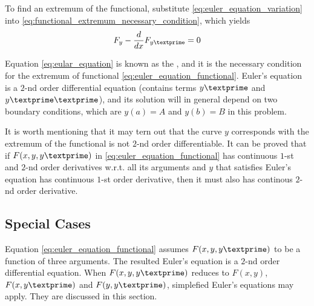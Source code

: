 To find an extremum of the functional, substitute \eqref{eq:euler_equation_variation} into \eqref{eq:functional_extremum_necessary_condition}, which yields
\begin{eqnarray}
F_y - \dfrac{d}{dx}F_{y\textprime} = 0 \label{eq:eular_equation}
\end{eqnarray}

Equation \eqref{eq:eular_equation} is known as the , and it is the necessary condition for the extremum of functional \eqref{eq:euler_equation_functional}. Euler's equation is a $2$-nd order differential equation (contains terms $y\textprime$ and $y\textprime\textprime$), and its solution will in general depend on two boundary conditions, which are $y(a)=A$ and $y(b)=B$ in this problem.

It is worth mentioning that it may tern out that the curve $y$ corresponds with the extremum of the functional is not $2$-nd order differentiable. It can be proved that if $F(x,y,y\textprime)$ in \eqref{eq:euler_equation_functional} has continuous $1$-st and $2$-nd order derivatives w.r.t. all its arguments and $y$ that satisfies Euler's equation has continuous $1$-st order derivative, then it must also has continous $2$-nd order derivative. 

\subsection{Special Cases}

Equation \eqref{eq:euler_equation_functional} assumes $F(x,y,y\textprime)$ to be a function of three arguments. The resulted Euler's equation is a $2$-nd order differential equation. When $F(x,y,y\textprime)$ reduces to $F(x,y)$, $F(x,y\textprime)$ and $F(y,y\textprime)$, simplefied Euler's equations may apply. They are discussed in this section.
